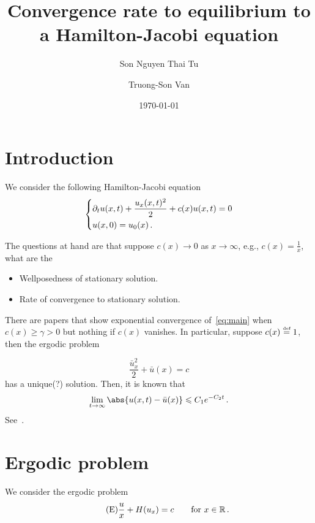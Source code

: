 \documentclass[12pt]{article}
\title{ Convergence rate to equilibrium to a Hamilton-Jacobi equation }
\author[1]{Son Nguyen Thai Tu}
\author[2]{Truong-Son Van}
\affil[1]{University of Wisconsin, Madison}
\affil[2]{Carnegie Mellon University}
\date{\today}
\begin{document}
\maketitle

\section{Introduction}
We consider the following Hamilton-Jacobi equation 
\begin{equation} \label{eq:main}
    \begin{dcases}
        \partial_t u(x,t) + \frac{u_x(x,t)^2}{2} + c(x)u(x,t) = 0     \\
        u(x,0) = u_0(x) \,.
    \end{dcases}
\end{equation}

The questions at hand are that suppose $c(x) \to 0$ as $x\to \infty$, e.g., $c(x) = \frac{1}{x}$, what are the
\begin{itemize}
    \item Wellposedness of stationary solution.
    \item Rate of convergence to stationary solution.
\end{itemize}

There are papers that show exponential convergence of~\eqref{eq:main} when $c(x) \geq \gamma >0$ but nothing if $c(x)$ vanishes. In particular, suppose $c(x) \stackrel{\scriptscriptstyle\textup{def}}{=} 1 $, then the ergodic problem 

\begin{equation}
    \frac{\bar u_x^2}{2} + \bar u(x) = c 
\end{equation}
has a unique(?) solution.
Then, it is known that 
\begin{equation*}
    \lim_{t\to\infty} \abs{ u(x,t) - \bar u(x)} \leq C_1e^{-C_2t} \,.
\end{equation*}
See~\cite{FujitaLoreti2009}.

\section{Ergodic problem}
We consider the ergodic problem 
\begin{equation}\label{eq:ergodic}
    \tag{E}
    \frac{u}{x} + H(u_x) = c \qquad \text{for } x\in \mathbb{R}\,.
\end{equation}
\end{document}
